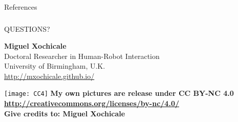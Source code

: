 \documentclass{beamer}
\begin{document}
 


 \begin{frame}{References}
  \nocite{*}
  
  
  


%  
\end{frame}





\begin{frame}
\frametitle{}

\vspace{2cm}
\begin{center}
\LARGE{QUESTIONS?} 
\end{center}

\vspace{1cm}

\normalsize 
\textbf{Miguel Xochicale} \\
Doctoral Researcher in Human-Robot Interaction \\
University of Birmingham, U.K. \\ 
{\color{blue} \href{http://mxochicale.github.io/}{http://mxochicale.github.io/ } } \\

   
\vspace{1cm}


\texttt{[image: CC4]}
\tiny{ 
\textbf{My own pictures are release under CC BY-NC 4.0
{\color{blue} \href{http://creativecommons.org/licenses/by-nc/4.0/}{http://creativecommons.org/licenses/by-nc/4.0/} } \\
Give credits to: Miguel Xochicale
}
}

\end{frame}

% 
\end{document}

